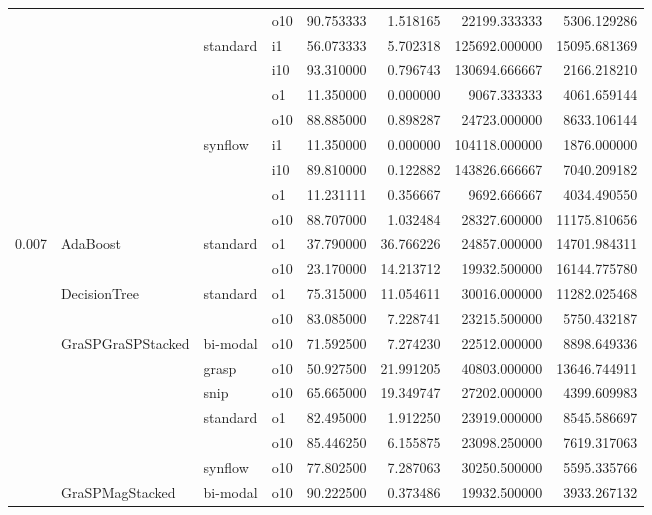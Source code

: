 \begin{longtable}{llllrrrr}
      &     &         & o10 &  90.753333 &   1.518165 &     22199.333333 &   5306.129286 \\
      &     & standard & i1 &  56.073333 &   5.702318 &    125692.000000 &  15095.681369 \\
      &     &         & i10 &  93.310000 &   0.796743 &    130694.666667 &   2166.218210 \\
      &     &         & o1 &  11.350000 &   0.000000 &      9067.333333 &   4061.659144 \\
      &     &         & o10 &  88.885000 &   0.898287 &     24723.000000 &   8633.106144 \\
      &     & synflow & i1 &  11.350000 &   0.000000 &    104118.000000 &   1876.000000 \\
      &     &         & i10 &  89.810000 &   0.122882 &    143826.666667 &   7040.209182 \\
      &     &         & o1 &  11.231111 &   0.356667 &      9692.666667 &   4034.490550 \\
      &     &         & o10 &  88.707000 &   1.032484 &     28327.600000 &  11175.810656 \\
0.007 & AdaBoost & standard & o1 &  37.790000 &  36.766226 &     24857.000000 &  14701.984311 \\
      &     &         & o10 &  23.170000 &  14.213712 &     19932.500000 &  16144.775780 \\
      & DecisionTree & standard & o1 &  75.315000 &  11.054611 &     30016.000000 &  11282.025468 \\
      &     &         & o10 &  83.085000 &   7.228741 &     23215.500000 &   5750.432187 \\
      & GraSPGraSPStacked & bi-modal & o10 &  71.592500 &   7.274230 &     22512.000000 &   8898.649336 \\
      &     & grasp & o10 &  50.927500 &  21.991205 &     40803.000000 &  13646.744911 \\
      &     & snip & o10 &  65.665000 &  19.349747 &     27202.000000 &   4399.609983 \\
      &     & standard & o1 &  82.495000 &   1.912250 &     23919.000000 &   8545.586697 \\
      &     &         & o10 &  85.446250 &   6.155875 &     23098.250000 &   7619.317063 \\
      &     & synflow & o10 &  77.802500 &   7.287063 &     30250.500000 &   5595.335766 \\
      & GraSPMagStacked & bi-modal & o10 &  90.222500 &   0.373486 &     19932.500000 &   3933.267132 \\

\end{longtable}
